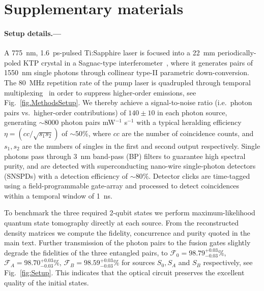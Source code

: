 \documentclass[aps,floatfix,superscriptaddress,twocolumn,tightenlines,amsmath,amssymb,nofootinbib,10pt]{revtex4-1}
\begin{document}
\section*{Supplementary materials}

\paragraph*{Setup details.--- }
A \SI{775}{nm}, \SI{1.6}{ps}-pulsed Ti:Sapphire laser is focused into a \SI{22}{mm} periodically-poled KTP crystal in a Sagnac-type interferometer~\cite{Fedrizzi2007Sagnac}, where it generates pairs of \SI{1550}{nm} single photons through collinear type-II parametric down-conversion. The \SI{80}{MHz} repetition rate of the pump laser is quadrupled through temporal multiplexing~\cite{Broome2011} in order to suppress higher-order emissions, see Fig.~\ref{fig.MethodsSetup}. We thereby achieve a signal-to-noise ratio (i.e.\ photon pairs vs.\ higher-order contributions) of $140\pm 10$ in each photon source, generating $\sim 8000$ photon pairs mW$^{-1}$ s$^{-1}$ with a typical heralding efficiency $\eta=(cc/\sqrt{s_{1}s_{2}})$ of $\sim 50\%$, where $cc$ are the number of coincidence counts, and $s_1, s_2$ are the numbers of singles in the first and second output respectively. Single photons pass through \SI{3}{nm} band-pass (BP) filters to guarantee high spectral purity, and are detected with superconducting nano-wire single-photon detectors (SNSPDs) with a detection efficiency of $\sim 80\%$. Detector clicks are time-tagged using a field-programmable gate-array and processed to detect coincidences within a temporal window of \SI{1}{ns}.

To benchmark the three required 2-qubit states we perform maximum-likelihood quantum state tomography directly at each source. From the reconstructed density matrices we compute the fidelity, concurrence and purity quoted in the main text. Further transmission of the photon pairs to the fusion gates slightly degrade the fidelities of the three entangled pairs, to $\mathcal{F}_{0}=98.79^{+0.03}_{-0.03}\%$, $\mathcal{F}_{A}=98.70^{+0.03}_{-0.03}\%$, $\mathcal{F}_{B}=98.59^{+0.03}_{-0.03}\%$ for sources $S_0, S_A$ and $S_B$ respectively, see Fig.~\ref{fig:Setup}. This indicates that the optical circuit preserves the excellent quality of the initial states.
\end{document}
